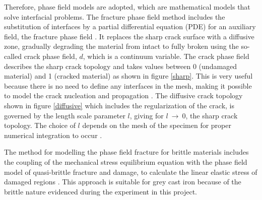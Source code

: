\documentclass[11pt,a4paper]{article}
\begin{document}
\noindent Therefore, phase field models are adopted, which are mathematical models that solve interfacial problems. The fracture phase field method includes the substitution of interfaces by a partial differential equation (PDE) for an auxiliary field, the fracture phase field \cite{CARRARA2020112731}. It replaces the sharp crack surface with a diffusive zone, gradually degrading the material from intact to fully broken using the so-called crack phase field, $d$, which is a continuum variable. The crack phase field describes the sharp crack topology and takes values between 0 (undamaged material) and 1 (cracked material) as shown in figure \ref{sharp}. This is very useful because there is no need to define any interfaces in the mesh, making it possible to model the crack nucleation and propagation \cite{ambati2015review} \cite{WU20201}. The diffusive crack topology shown in figure \ref{diffusive} which includes the regularization of the crack, is governed by the length scale parameter $l$, giving for $l~\rightarrow~0$, the sharp crack topology. The choice of $l$ depends on the mesh of the specimen for proper numerical integration to occur \cite{Aldakheel2022} \cite{MIEHE2015449}.

\noindent The method for modelling the phase field fracture for brittle materials includes the coupling of the mechanical stress equilibrium equation with the phase field model of quasi-brittle fracture and damage, to calculate the linear elastic stress of damaged regions \cite{WU201772}. This approach is suitable for grey cast iron because of the brittle nature evidenced during the experiment in this project.
\end{document}
